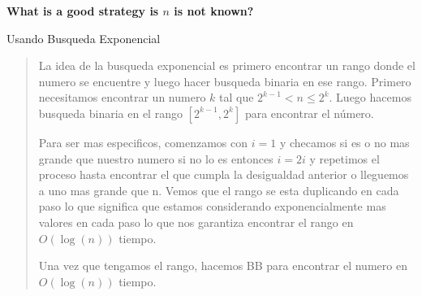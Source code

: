 \textbf{What is a good strategy is $n$ is not known?}\vspace{.2cm}

\textcolor{bibi}{Usando Busqueda Exponencial}
\begin{quote}
    La idea de la busqueda exponencial es primero encontrar un rango donde el numero se encuentre y luego hacer busqueda binaria en ese rango. Primero necesitamos encontrar un numero $k$ tal que $2^{k-1} < n \leq 2^k$. Luego hacemos busqueda binaria en el rango $[2^{k-1}, 2^k]$ para encontrar el número. \vspace{.2cm}

    Para ser mas especificos, comenzamos con $i = 1$ y checamos si es o no mas grande que nuestro numero si no lo es entonces $i = 2i$ y repetimos el proceso hasta encontrar el que cumpla la desigualdad anterior o lleguemos a uno mas grande que n. Vemos que el rango se esta duplicando en cada paso lo que significa que estamos considerando exponencialmente mas valores en cada paso lo que nos garantiza encontrar el rango en $O(\log(n))$ tiempo. \vspace{.2cm}

    Una vez que tengamos el rango, hacemos BB para encontrar el numero en $O(\log(n))$ tiempo. \vspace{.2cm}
\end{quote}